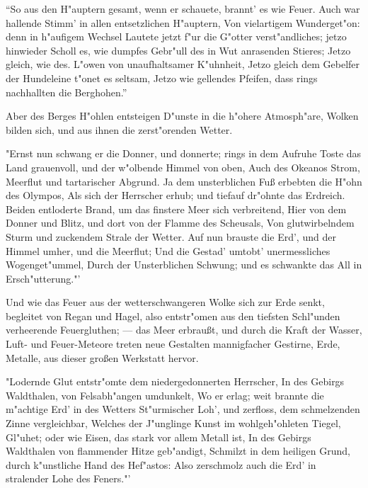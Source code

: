 \documentclass[a4paper, 11pt, oneside, polutonikogreek, german]{article}
\begin{document}
"`So aus den H"auptern gesamt, wenn er schauete, brannt' es wie Feuer. Auch war hallende Stimm' in allen entsetzlichen H"auptern, Von vielartigem Wunderget"on: denn in h"aufigem Wechsel Lautete jetzt f"ur die G"otter verst"andliches; jetzo hinwieder Scholl es, wie dumpfes Gebr"ull des in Wut anrasenden Stieres; Jetzo gleich, wie des. L"owen von unaufhaltsamer K"uhnheit, Jetzo gleich dem Gebelfer der Hundeleine t"onet es seltsam, Jetzo wie gellendes Pfeifen, dass rings nachhallten die Berghohen."'

Aber des Berges H"ohlen entsteigen D"unste in die h"ohere Atmosph"are, Wolken bilden sich, und aus ihnen die zerst"orenden Wetter.

"Ernst nun schwang er die Donner, und donnerte; rings in dem Aufruhe Toste das Land grauenvoll, und der w"olbende Himmel von oben, Auch des Okeanos Strom, Meerflut und tartarischer Abgrund. Ja dem unsterblichen Fuß erbebten die H"ohn des Olympos, Als sich der Herrscher erhub; und tiefauf dr"ohnte das Erdreich. Beiden entloderte Brand, um das finstere Meer sich verbreitend, Hier von dem Donner und Blitz, und dort von der Flamme des Scheusals, Von glutwirbelndem Sturm und zuckendem Strale der Wetter. Auf nun brauste die Erd', und der Himmel umher, und die Meerflut; Und die Gestad' umtobt' unermessliches Wogenget"ummel, Durch der Unsterblichen Schwung; und es schwankte das All in Ersch"utterung."'

Und wie das Feuer aus der wetterschwangeren Wolke sich zur Erde senkt, begleitet von Regan und Hagel, also entstr"omen aus den tiefsten Schl"unden verheerende Feuergluthen; --- das Meer erbraußt, und durch die Kraft der Wasser, Luft- und Feuer-Meteore treten neue Gestalten mannigfacher Gestirne, Erde, Metalle, aus dieser großen Werkstatt hervor.

"Lodernde Glut entstr"omte dem niedergedonnerten Herrscher, In des Gebirgs Waldthalen, von Felsabh"angen umdunkelt, Wo er erlag; weit brannte die m"achtige Erd' in des Wetters St"urmischer Loh', und zerfloss, dem schmelzenden Zinne vergleichbar, Welches der J"unglinge Kunst im wohlgeh"ohleten Tiegel, Gl"uhet; oder wie Eisen, das stark vor allem Metall ist, In des Gebirgs Waldthalen von flammender Hitze geb"andigt, Schmilzt in dem heiligen Grund, durch k"unstliche Hand des Hef"astos: Also zerschmolz auch die Erd' in stralender Lohe des Feners."'
\end{document}
